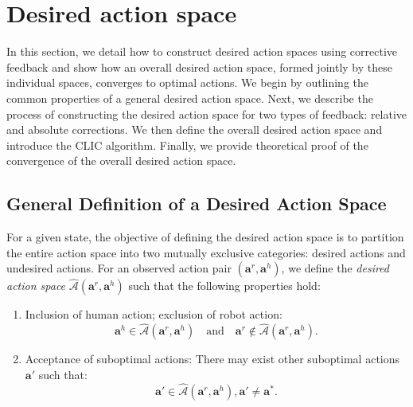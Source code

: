 \section{Desired action space}
\label{sec:Desired_action_space}
In this section, we detail how to construct desired action spaces using corrective feedback and show how an overall desired action space, formed jointly by these individual spaces, converges to optimal actions.
We begin by outlining the common properties of a general desired action space. Next, we describe the process of constructing the desired action space for two types of feedback: relative and absolute corrections.
We then define the overall desired action space and introduce the CLIC algorithm.  Finally, we provide theoretical proof of the convergence of the overall desired action space.

\subsection{General Definition of a Desired Action Space}
\label{sec:sub:general_def_desiredA}
For a given state, the objective of defining the desired action space is to partition the entire action space into two mutually exclusive categories: {desired actions} and {undesired actions}. 
For an observed action pair \((\bm{a}^r, \bm{a}^h)\), we define the \textit{desired action space} \(\hat{\mathcal{A}}(\bm{a}^r, \bm{a}^h)\) such that the following properties hold:

\begin{enumerate}
    \item {Inclusion of human action; exclusion of robot action:}
    \[
    \bm{a}^h \in \hat{\mathcal{A}}(\bm{a}^r, \bm{a}^h) \quad \text{and} \quad \bm{a}^r \notin \hat{\mathcal{A}}(\bm{a}^r, \bm{a}^h).
    \]
    \item {Acceptance of suboptimal actions:}
    There may exist other suboptimal actions \(\bm{a}' \) such that:
    \[
    \bm{a}' \in \hat{\mathcal{A}}(\bm{a}^r, \bm{a}^h), \bm{a}' \neq \bm{a}^*.
    \]
\end{enumerate}

